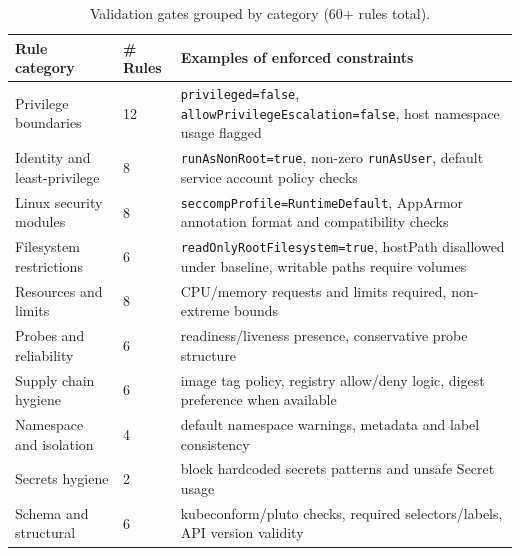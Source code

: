\documentclass[preprint,12pt]{elsarticle}
\begin{document}
\begin{table}[!t]
\centering
\caption{Validation gates grouped by category (60+ rules total).}
\label{tab:validator_taxonomy}
\small
\setlength{\tabcolsep}{5pt}
\renewcommand{\arraystretch}{1.1}
\begin{tabularx}{\linewidth}{@{} l p{1.5cm} X @{}}
\toprule
\textbf{Rule category} & \textbf{\# Rules} & \textbf{Examples of enforced constraints} \\
\midrule
Privilege boundaries & 12 & \texttt{privileged=false}, \texttt{allowPrivilegeEscalation=false}, host namespace usage flagged \\
Identity and least-privilege & 8 & \texttt{runAsNonRoot=true}, non-zero \texttt{runAsUser}, default service account policy checks \\
Linux security modules & 8 & \texttt{seccompProfile=RuntimeDefault}, AppArmor annotation format and compatibility checks \\
Filesystem restrictions & 6 & \texttt{readOnlyRootFilesystem=true}, hostPath disallowed under baseline, writable paths require volumes \\
Resources and limits & 8 & CPU/memory requests and limits required, non-extreme bounds \\
Probes and reliability & 6 & readiness/liveness presence, conservative probe structure \\
Supply chain hygiene & 6 & image tag policy, registry allow/deny logic, digest preference when available \\
Namespace and isolation & 4 & default namespace warnings, metadata and label consistency \\
Secrets hygiene & 2 & block hardcoded secrets patterns and unsafe Secret usage \\
Schema and structural & 6 & kubeconform/pluto checks, required selectors/labels, API version validity \\
\bottomrule
\end{tabularx}
\end{table}
\end{document}
